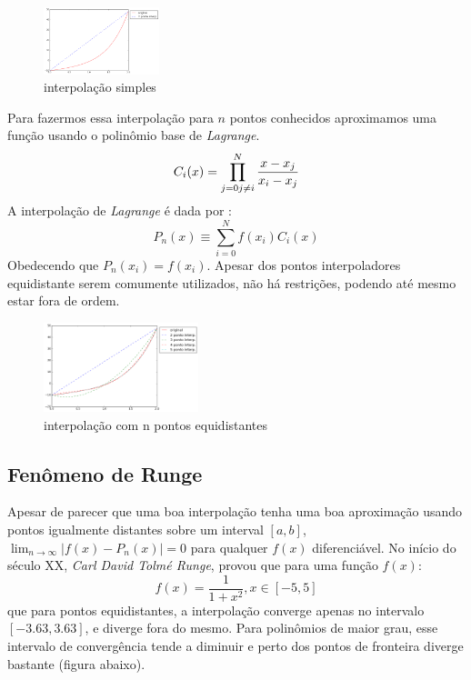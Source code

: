 \begin{figure}[!ht]
  \includegraphics[width=0.3\textwidth,center]{figuras/interpolacao_linear.png}
  \caption{interpolação simples}
\end{figure}
 Para fazermos essa interpolação para $n$ pontos conhecidos aproximamos uma função usando o polinômio base de \emph{Lagrange}.
\begin{equation}
C_i(x) = \prod_{j = 0 \\ j \neq i}^{N} \frac{x - x_j}{x_i - x_j} 
\end{equation}
 A interpolação de \emph{Lagrange} é dada por :
\begin{equation}
 P_n(x) \equiv \sum_{i = 0}^{N} f(x_i)C_i(x) 
\end{equation}
 Obedecendo que $P_n(x_i) = f(x_i)$. Apesar dos pontos interpoladores equidistante serem comumente utilizados, não há restrições, podendo até mesmo estar fora de ordem.
\begin{figure}[h]
  \includegraphics[width=0.4\textwidth, center]{figuras/interpolacao_linear5.png}
  \caption{interpolação com n pontos equidistantes}
\end{figure}


\subsection{Fenômeno de Runge}
 Apesar de parecer que uma boa interpolação tenha uma boa aproximação usando pontos igualmente distantes sobre um interval $[a,b]$, $\lim_{n \rightarrow \infty} |f(x) - P_n(x)| = 0$ para qualquer $f(x)$ diferenciável.
 No início do século XX, \emph{Carl David Tolmé Runge}, provou que para uma função $f(x)$:
 \begin{equation}
 f(x) = \frac{1}{1 + x^2} , x \in [-5,5]
 \end{equation}
 que para pontos equidistantes, a interpolação converge apenas no intervalo $[-3.63,3.63]$, e diverge fora do mesmo. Para polinômios de maior grau, esse intervalo de convergência tende a diminuir e perto dos pontos de fronteira diverge bastante (figura abaixo).

